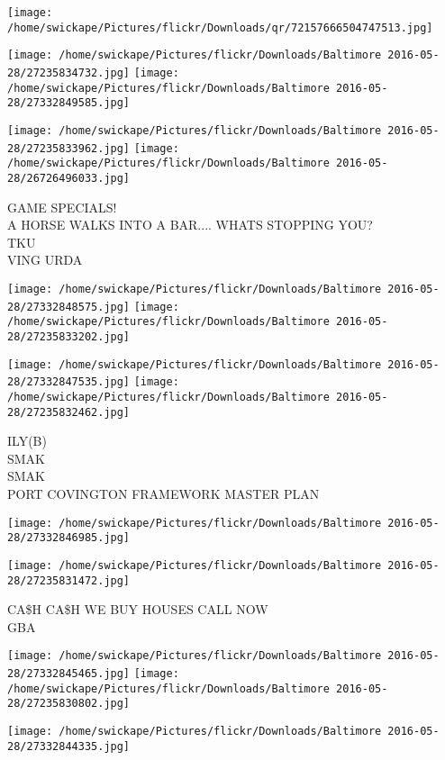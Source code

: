 \documentclass[10pt,letterpaper]{article}
\begin{document}
\texttt{[image: /home/swickape/Pictures/flickr/Downloads/qr/72157666504747513.jpg]}
\pagebreak

\texttt{[image: /home/swickape/Pictures/flickr/Downloads/Baltimore 2016-05-28/27235834732.jpg]}
\texttt{[image: /home/swickape/Pictures/flickr/Downloads/Baltimore 2016-05-28/27332849585.jpg]}

\texttt{[image: /home/swickape/Pictures/flickr/Downloads/Baltimore 2016-05-28/27235833962.jpg]}
\texttt{[image: /home/swickape/Pictures/flickr/Downloads/Baltimore 2016-05-28/26726496033.jpg]}

GAME SPECIALS!\\
A HORSE WALKS INTO A BAR.... WHATS STOPPING YOU?\\
TKU\\
VING URDA
\pagebreak

\texttt{[image: /home/swickape/Pictures/flickr/Downloads/Baltimore 2016-05-28/27332848575.jpg]}
\texttt{[image: /home/swickape/Pictures/flickr/Downloads/Baltimore 2016-05-28/27235833202.jpg]}

\texttt{[image: /home/swickape/Pictures/flickr/Downloads/Baltimore 2016-05-28/27332847535.jpg]}
\texttt{[image: /home/swickape/Pictures/flickr/Downloads/Baltimore 2016-05-28/27235832462.jpg]}

ILY(B)\\
SMAK\\
SMAK\\
PORT COVINGTON FRAMEWORK MASTER PLAN
\pagebreak

\texttt{[image: /home/swickape/Pictures/flickr/Downloads/Baltimore 2016-05-28/27332846985.jpg]}

\vspace{0.25in}
\texttt{[image: /home/swickape/Pictures/flickr/Downloads/Baltimore 2016-05-28/27235831472.jpg]}

CA\$H CA\$H WE BUY HOUSES CALL NOW\\
GBA
\pagebreak

\texttt{[image: /home/swickape/Pictures/flickr/Downloads/Baltimore 2016-05-28/27332845465.jpg]}
\texttt{[image: /home/swickape/Pictures/flickr/Downloads/Baltimore 2016-05-28/27235830802.jpg]}

\texttt{[image: /home/swickape/Pictures/flickr/Downloads/Baltimore 2016-05-28/27332844335.jpg]}
\end{document}

